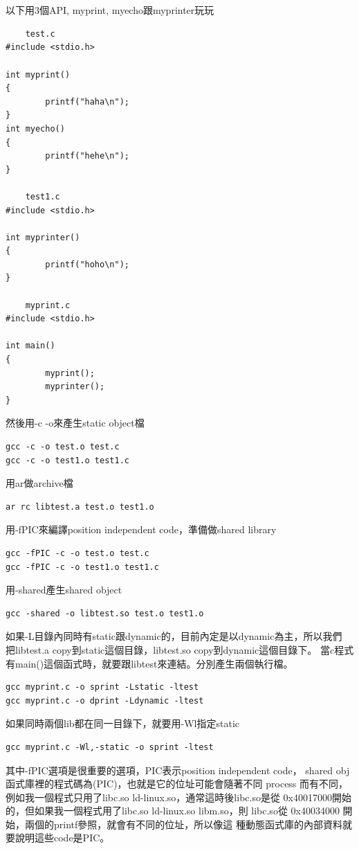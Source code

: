     \\\\
    以下用3個API, myprint, myecho跟myprinter玩玩
    \begin{verbatim}
    test.c
#include <stdio.h>

int myprint()
{
        printf("haha\n");
}
int myecho()
{
        printf("hehe\n");
}

    test1.c
#include <stdio.h>

int myprinter()
{
        printf("hoho\n");
}

    myprint.c
#include <stdio.h>

int main()
{
        myprint();
        myprinter();
}
    \end{verbatim}
    然後用-c -o來產生static object檔
    \begin{verbatim}	
gcc -c -o test.o test.c
gcc -c -o test1.o test1.c
    \end{verbatim}
    用ar做archive檔
    \begin{verbatim}	
ar rc libtest.a test.o test1.o
    \end{verbatim}
    用-fPIC來編譯position independent code，準備做shared library
    \begin{verbatim}
gcc -fPIC -c -o test.o test.c
gcc -fPIC -c -o test1.o test1.c
    \end{verbatim}
    用-shared產生shared object
    \begin{verbatim}
gcc -shared -o libtest.so test.o test1.o
    \end{verbatim}
    如果-L目錄內同時有static跟dynamic的，目前內定是以dynamic為主，所以我們
    把libtest.a copy到static這個目錄，libtest.so copy到dynamic這個目錄下。
    當c程式有main()這個函式時，就要跟libtest來連結。分別產生兩個執行檔。
    \begin{verbatim}
gcc myprint.c -o sprint -Lstatic -ltest
gcc myprint.c -o dprint -Ldynamic -ltest
    \end{verbatim}
    如果同時兩個lib都在同一目錄下，就要用-Wl指定static
    \begin{verbatim}
gcc myprint.c -Wl,-static -o sprint -ltest
    \end{verbatim}
    其中-fPIC選項是很重要的選項，PIC表示position independent code，
    shared obj函式庫裡的程式碼為(PIC)，也就是它的位址可能會隨著不同 process
    而有不同，例如我一個程式只用了libc.so ld-linux.so，通常這時後libc.so是從
    0x40017000開始的，但如果我一個程式用了libc.so ld-linux.so libm.so，則
    libc.so從 0x40034000 開始，兩個的printf參照，就會有不同的位址，所以像這
    種動態函式庫的內部資料就要說明這些code是PIC。
